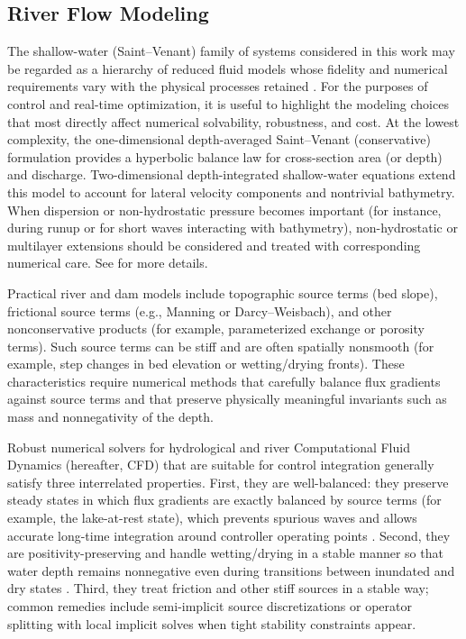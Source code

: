 \documentclass{article}
\newcommand{\1}{\mathds{1}}          %
\theoremstyle{definition}
\begin{document}
\begin{sloppypar}
\subsection{River Flow Modeling}


The shallow-water (Saint--Venant) family of systems considered in this work may be regarded as a hierarchy of reduced fluid models whose fidelity and numerical requirements vary with the physical processes retained \cite{LeVeque_2002,toro2009}. For the purposes of control and real-time optimization, it is useful to highlight the modeling choices that most directly affect numerical solvability, robustness, and cost. At the lowest complexity, the one-dimensional depth-averaged Saint--Venant (conservative) formulation provides a hyperbolic balance law for cross-section area (or depth) and discharge. Two-dimensional depth-integrated shallow-water equations extend this model to account for lateral velocity components and nontrivial bathymetry. When dispersion or non-hydrostatic pressure becomes important (for instance, during runup or for short waves interacting with bathymetry), non-hydrostatic or multilayer extensions should be considered and treated with corresponding numerical care. See \cite{Bear_Verruijt} for more details.

Practical river and dam models include topographic source terms (bed slope), frictional source terms (e.g., Manning or Darcy--Weisbach), and other nonconservative products (for example, parameterized exchange or porosity terms). Such source terms can be stiff and are often spatially nonsmooth (for example, step changes in bed elevation or wetting/drying fronts). These characteristics require numerical methods that carefully balance flux gradients against source terms and that preserve physically meaningful invariants such as mass and nonnegativity of the depth.

Robust numerical solvers for hydrological and river Computational Fluid Dynamics (hereafter, CFD) that are suitable for control integration generally satisfy three interrelated properties. First, they are well-balanced: they preserve steady states in which flux gradients are exactly balanced by source terms (for example, the lake-at-rest state), which prevents spurious waves and allows accurate long-time integration around controller operating points \cite{audusse2004}. Second, they are positivity-preserving and handle wetting/drying in a stable manner so that water depth remains nonnegative even during transitions between inundated and dry states \cite{kurganov2007}. Third, they treat friction and other stiff sources in a stable way; common remedies include semi-implicit source discretizations or operator splitting with local implicit solves when tight stability constraints appear.


\end{sloppypar}
\end{document}
